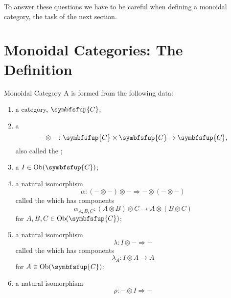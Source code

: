 \documentclass[fleqn]{NotesClass}
\newcommand{\cat}[1]{\symbfsfup{#1}}
\DeclareMathOperator{\Ob}{Ob}
\newcommand{\naturalTransformation}{\Rightarrow}
\begin{document}
    To answer these questions we have to be careful when defining a monoidal category, the task of the next section.
    
    \section{Monoidal Categories: The Definition}
    \begin{dfn}{Monoidal Category}{}
        A  is formed from the following data:
        \begin{enumerate}
            \item a category, \(\cat{C}\);
            \item a 
            \begin{equation}
                {-} \otimes {-} \colon \cat{C} \times \cat{C} \to \cat{C},
            \end{equation}
            also called the ;
            \item a  \(I \in \Ob(\cat{C})\);
            \item a natural isomorphism
            \begin{equation}
                \alpha \colon ({-} \otimes {-}) \otimes {-} \naturalTransformation {-} \otimes ({-} \otimes {-})
            \end{equation}
            called the  which has components
            \begin{equation}
                \alpha_{A,B,C} \colon (A \otimes B) \otimes C \to A \otimes (B \otimes C)
            \end{equation}
            for \(A, B, C \in \Ob(\cat{C})\);
            \item a natural isomorphism
            \begin{equation}
                \lambda \colon I \otimes {-} \naturalTransformation -
            \end{equation}
            called the  which has components
            \begin{equation}
                \lambda_A \colon I \otimes A \to A
            \end{equation}
            for \(A \in \Ob(\cat{C})\);
            \item a natural isomorphism
            \begin{equation}
                \rho \colon {-} \otimes I \naturalTransformation -

\end{equation}
\end{enumerate}
\end{dfn}
\end{document}
